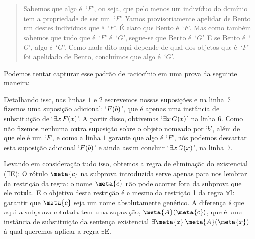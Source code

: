 \begin{quote}
Sabemos que algo é~`$F$', ou seja, que pelo menos um indivíduo do domínio tem a propriedade de ser um~`$F$'. Vamos provisoriamente apelidar de Bento um destes indivíduos que é~`$F$'. É claro que Bento é~`$F$'. Mas como também sabemos que tudo que é~`$F$' é~`$G$', segue-se que Bento é~`$G$'. E se Bento é~`$G$', algo é~`$G$'. Como nada dito aqui depende de qual dos objetos que é~`$F$’ foi apelidado de Bento, concluímos que algo é~`$G$'.		
	\end{quote}
 Podemos tentar capturar esse padrão de raciocínio em uma prova da seguinte maneira:
\begin{fitchproof}
	\open
		 
	\close
\end{fitchproof}\noindent

Detalhando isso, nas linhas $1$ e $2$ escrevemos nossas suposições e na linha~$3$ fizemos uma suposição adicional: `$\mathord{F}(b)$', que é apenas uma instância de substituição de `$\exists x\,\mathord{F}(x)$'. A partir disso, obtivemos `$\exists x\,\mathord{G}(x)$' na linha $6$. Como não fizemos nenhuma outra suposição sobre o objeto nomeado por `$b$', além de que ele é um `$F$', e como a linha $1$ garante que algo é `$F$', nós podemos descartar esta suposição adicional `$\mathord{F}(b)$' e ainda assim concluir `$\exists x\,\mathord{G}(x)$', na linha~$7$.

Levando em consideração tudo isso, obtemos a regra de eliminação  do existencial ($\exists$E):
O rótulo $\meta{c}$ na subprova introduzida serve apenas para nos lembrar da restrição da regra: o nome $\meta{c}$ não pode ocorrer fora da subprova que ele rotula.
E o objetivo desta restrição é o mesmo da restrição 1 da regra $\forall$I: garantir que $\meta{c}$ seja um nome absolutamente genérico.
A diferença é que aqui a subprova rotulada tem uma suposição, $\meta{A}(\meta{c})$, que é uma instância de substituição da sentença existencial $\exists \meta{x}\,\meta{A}(\meta{x})$ à qual queremos aplicar a regra $\exists$E.

